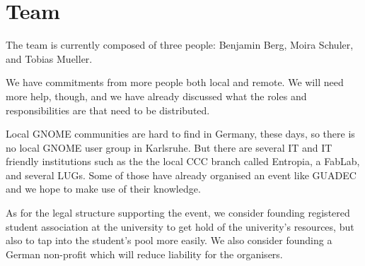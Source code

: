 
\section{Team}

The team is currently composed of three people:
Benjamin Berg, Moira Schuler, and Tobias Mueller.

We have commitments from more people both local and remote.
We will need more help, though, and we have already discussed
what the roles and responsibilities are that need to be distributed.

Local GNOME communities are hard to find in Germany, these days,
so there is no local GNOME user group in Karlsruhe.
But there are several IT and IT friendly institutions such as the
the local CCC branch called Entropia, a FabLab, and several LUGs.
Some of those have already organised an event like GUADEC and
we hope to make use of their knowledge.

As for the legal structure supporting the event,
we consider founding registered student association at
the university to get hold of the univerity's resources,
but also to tap into the student's pool more easily.
We also consider founding a German non-profit which will reduce
liability for the organisers.
